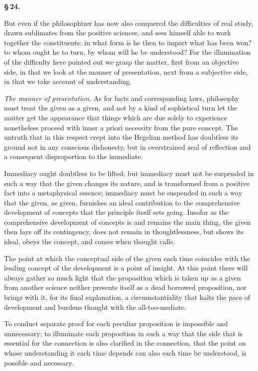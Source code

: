 \documentclass[12pt]{book}
\begin{document}
\begin{center}{\bfseries \S\,24.}\end{center}

But even if the philosophizer has now also conquered the difficulties of real study, drawn
sublimates from the positive sciences, and sees himself able to work together the constituents:
in what form is he then to impart what has been won? to whom ought he to turn, by whom will he
be understood? For the illumination of the difficulty here pointed out we grasp the matter,
first from an objective side, in that we look at the manner of presentation, next from a
subjective side, in that we take account of understanding.

\emph{The manner of presentation.} As for facts and corresponding laws, philosophy must treat
the given as a given, and not by a kind of sophistical turn let the matter get the appearance
that things which are due solely to experience nonetheless proceed with inner a priori necessity
from the pure concept. The untruth
that in this respect crept into the Hegelian method has doubtless its ground not in any conscious
dishonesty, but in overstrained zeal of reflection and a consequent disproportion to the immediate.

Immediacy ought doubtless to be lifted; but immediacy must not be suspended in such a way that the
given changes its nature, and is transformed from a positive fact into a metaphysical essence;
immediacy must be suspended in such a way that the given, as given, furnishes an ideal contribution
to the comprehensive development of concepts that the principle itself sets going. Insofar as the
comprehensive development of concepts is and remains the main thing, the given then lays off its
contingency, does not remain in thoughtlessness, but shows its ideal, obeys the concept, and comes
when thought calls.

The point at which the conceptual side of the given each time coincides with the leading concept of
the development is a point of insight. At this point there will always gather so much light that the
proposition which is taken up as a given from another science neither presents itself as a dead
borrowed proposition, nor brings with it, for its final explanation, a circumstantiality that halts
the pace of development and burdens thought with the all-too-mediate.

To conduct separate proof for each peculiar proposition is impossible and unnecessary; to illuminate
each proposition in such a way that the side that is essential for the connection is also clarified
in the connection, that the point on whose understanding it each time depends can also each time be
understood, is possible and necessary.
\end{document}

